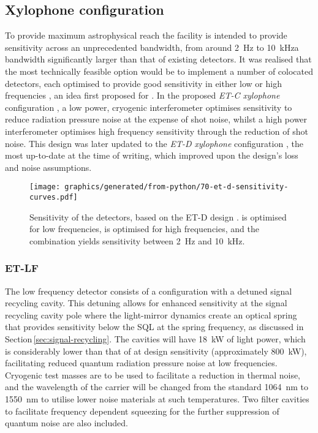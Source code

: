 \subsection{Xylophone configuration}
To provide maximum astrophysical reach the facility is intended to provide sensitivity across an unprecedented bandwidth, from around \SI{2}{\hertz} to \SI{10}{\kilo\hertz}\textemdash a bandwidth significantly larger than that of existing detectors. It was realised that the most technically feasible option would be to implement a number of colocated detectors, each optimised to provide good sensitivity in either low or high frequencies \cite{Hild2010}, an idea first proposed for \ALIGO{} \cite{Conforto2004}. In the proposed \emph{ET-C xylophone} configuration \cite{Hild2010}, a low power, cryogenic interferometer optimises sensitivity to reduce radiation pressure noise at the expense of shot noise, whilst a high power interferometer optimises high frequency sensitivity through the reduction of shot noise. This design was later updated to the \emph{ET-D xylophone} configuration \cite{Hild2011}, the most up-to-date at the time of writing, which improved upon the design's loss and noise assumptions.

\begin{figure}
  \centering
  \texttt{[image: graphics/generated/from-python/70-et-d-sensitivity-curves.pdf]}
  \caption[Sensitivity curves for the Einstein Telescope]{\label{fig:et-d-sensitivity}Sensitivity of the \ET{} detectors, based on the ET-D design \cite{Hild2011}. \ETLF{} is optimised for low frequencies, \ETHF{} is optimised for high frequencies, and the combination yields sensitivity between \SI{2}{\hertz} and \SI{10}{\kilo\hertz}.}
\end{figure}

\subsubsection{ET-LF}
The low frequency detector consists of a \DRFPMI{} configuration with a detuned signal recycling cavity. This detuning allows for enhanced sensitivity at the signal recycling cavity pole where the light-mirror dynamics create an optical spring that provides sensitivity below the \gls{SQL} at the spring frequency, as discussed in Section\,\ref{sec:signal-recycling}. The cavities will have \SI{18}{\kilo\watt} of light power, which is considerably lower than that of \ALIGO{} at design sensitivity (approximately \SI{800}{\kilo\watt}), facilitating reduced quantum radiation pressure noise at low frequencies. Cryogenic test masses are to be used to facilitate a reduction in thermal noise, and the wavelength of the carrier will be changed from the standard \SI{1064}{\nano\meter} to \SI{1550}{\nano\meter} to utilise lower noise materials at such temperatures. Two filter cavities to facilitate frequency dependent squeezing for the further suppression of quantum noise are also included.


